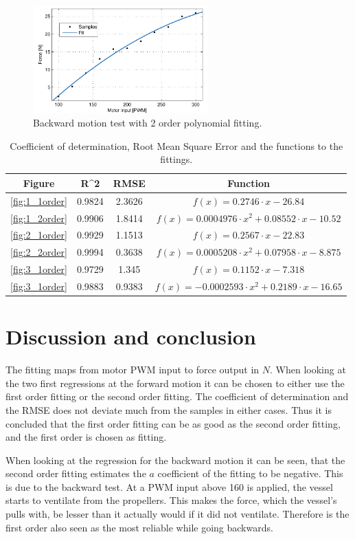 \begin{figure}[htbp]
	\centering
	\includegraphics[width=0.6\textwidth]{plot/both_force_3_2order}
	\caption{Backward motion test with 2 order polynomial fitting.}
	\label{fig:3_2order}
\end{figure}

\begin{table}[htbp]
\centering
\begin{tabular}{cccc}
	\toprule
  Figure & R^2 & RMSE & Function\\
  \midrule
  \ref{fig:1_1order} & 0.9824 & 2.3626 & $f(x)=0.2746\cdot x-26.84$\\
  \ref{fig:1_2order} & 0.9906 & 1.8414 & $f(x)=0.0004976\cdot x^2+0.08552\cdot x-10.52$\\
  \ref{fig:2_1order} & 0.9929 & 1.1513 & $f(x)=0.2567\cdot x-22.83$\\
  \ref{fig:2_2order} & 0.9994 & 0.3638 & $f(x)=0.0005208\cdot x^2+0.07958\cdot x-8.875$\\
  \ref{fig:3_1order} & 0.9729 & 1.345 & $f(x)=0.1152\cdot x-7.318$\\
  \ref{fig:3_1order} & 0.9883 & 0.9383 & $f(x)=-0.0002593\cdot x^2+0.2189\cdot x-16.65$\\
  \bottomrule
\end{tabular}
\caption{Coefficient of determination, Root Mean Square Error and the functions to the fittings.}
\label{tab:fitting}
\end{table}

\section{Discussion and conclusion}
The fitting maps from motor \ac{PWM} input to force output in $N$. When looking at the two first regressions at the forward motion it can be chosen to either use the first order fitting or the second order fitting. The coefficient of determination and the RMSE does not deviate much from the samples in either cases. Thus it is concluded that the first order fitting can be as good as the second order fitting, and the first order is chosen as fitting.

When looking at the regression for the backward motion it can be seen, that the second order fitting estimates the $a$ coefficient of the fitting to be negative. This is due to the backward test. At a \ac{PWM} input above 160 is applied, the vessel starts to ventilate from the propellers. This makes the force, which the vessel's pulls with, be lesser than it actually would if it did not ventilate. Therefore is the first order also seen as the most reliable while going backwards.